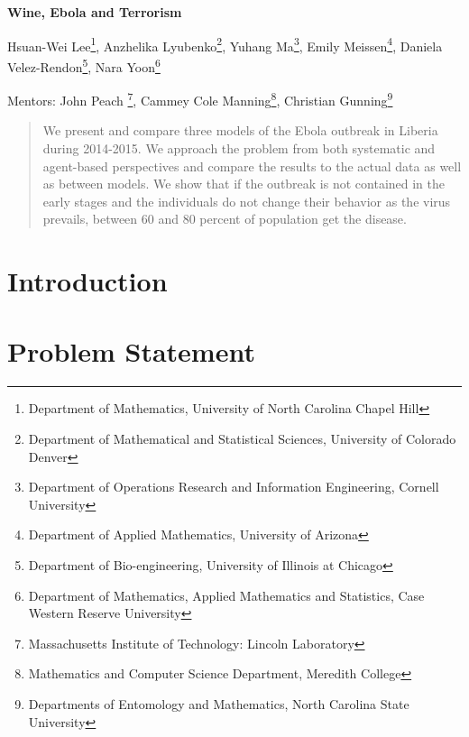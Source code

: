 \documentclass[10pt]{article}
\begin{document}
 

\centerline{\large \bf Wine, Ebola and Terrorism}

\vspace{.1truein}

\def\thefootnote{\arabic{footnote}}
\begin{center}
  Hsuan-Wei Lee\footnote{Department of Mathematics, University of North Carolina Chapel Hill},
  Anzhelika Lyubenko\footnote{Department of Mathematical and Statistical Sciences, University of Colorado Denver},
  Yuhang Ma\footnote{Department of Operations Research and Information Engineering, Cornell University},
  Emily Meissen\footnote{Department of Applied Mathematics, University of Arizona},
  Daniela Velez-Rendon\footnote{Department of Bio-engineering, University of Illinois at Chicago},
    Nara Yoon\footnote{
Department of Mathematics, Applied Mathematics and Statistics, Case Western Reserve University}
\end{center}


\begin{center}
Mentors: John Peach \footnote{Massachusetts Institute of Technology: Lincoln Laboratory}, Cammey Cole Manning\footnote{Mathematics and Computer Science Department, Meredith College},
Christian Gunning\footnote{Departments of Entomology and Mathematics, North Carolina State University}
\end{center}

\begin{abstract}
\noindent We present and compare three models of the Ebola outbreak in Liberia during 2014-2015. We approach the problem from both systematic and agent-based perspectives and compare the results to the actual data as well as between models. We show that if the outbreak is not contained in the early stages and the individuals do not change their behavior as the virus prevails, between 60 and 80 percent of population get the disease. 
\end{abstract}

\tableofcontents

\section{Introduction}



\section{Problem Statement}

\end{document}
